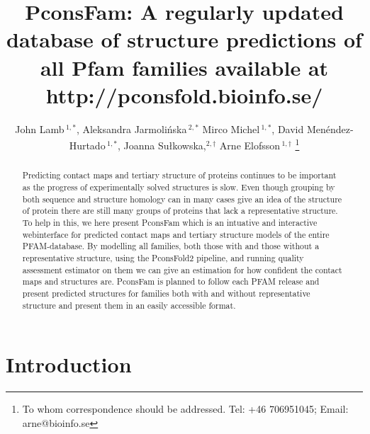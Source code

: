\documentclass[a4,center,fleqn]{NAR}
\begin{document}
\title{PconsFam: A regularly updated database of structure predictions of all Pfam families available at http://pconsfold.bioinfo.se/}

\author{%
John Lamb\,$^{1,*}$,
Aleksandra Jarmolińska\,$^{2,*}$
Mirco Michel\,$^{1,*}$,
David Menéndez-Hurtado\,$^{1,*}$,
Joanna Sułkowska,$^{2,\dagger}$
Arne Elofsson\,$^{1,\dagger}$%
\footnote{To whom correspondence should be addressed.
Tel: +46 706951045; Email: arne@bioinfo.se}}

\address{%
$^{1}$Science for Life Laboratory and Department of Biochemistry and
biophysics, Stockholm Unviersity, Tomtebodav 23, 171 21 Solna, Sweden
and
$^{2}$ Warsaw, Poland 
$^{*}$ contributed equally
$^{\dagger}$=contributing authors
}


\maketitle




\begin{abstract}
Predicting contact maps and tertiary structure of proteins continues
to be important as the progress of experimentally solved structures
is slow. 
Even though grouping by both sequence and structure homology can in many
cases give an idea of the structure of protein there are still
many groups of proteins that lack a representative structure.
To help in this, we here present PconsFam which is an intuative and
interactive webinterface for predicted contact maps and tertiary
structure models of the entire PFAM-database.
By modelling all families, both those with and those without a
representative structure, using the PconsFold2 pipeline, and running
quality assessment estimator on them we can give an estimation for how
confident the contact maps and structures are. 
PconsFam is planned to follow each PFAM release and present predicted
structures for families both with and without representative structure
and present them in an easily accessible format.

\end{abstract}

\section{Introduction}
\end{document}
